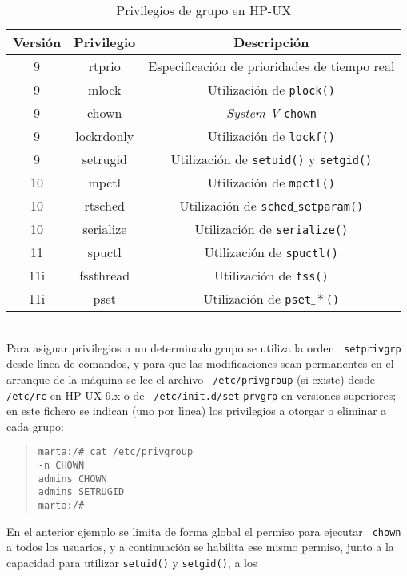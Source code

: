 \begin{table}
\begin{center}
\begin{tabular}{|c|c|c|}
\hline
Versi\'on & Privilegio & Descripci\'on\\
\hline
\hline
9 & {\sc rtprio} & Especificaci\'on de prioridades de tiempo real\\
\hline
9 & {\sc mlock} & Utilizaci\'on de {\tt plock()}\\
\hline
9 & {\sc chown} & {\it System V} {\tt chown}\\
\hline
9 & {\sc lockrdonly} & Utilizaci\'on de {\tt lockf()}\\
\hline
9 & {\sc setrugid} & Utilizaci\'on de {\tt setuid()} y {\tt setgid()}\\
\hline
10 & {\sc mpctl} & Utilizaci\'on de {\tt mpctl()}\\
\hline
10 & {\sc rtsched} & Utilizaci\'on de {\tt sched$\_$setparam()}\\
\hline
10 & {\sc serialize} & Utilizaci\'on de {\tt serialize()}\\
\hline
11 & {\sc spuctl} & Utilizaci\'on de {\tt spuctl()}\\
\hline
11i & {\sc fssthread} & Utilizaci\'on de {\tt fss()}\\
\hline
11i & {\sc pset} & Utilizaci\'on de {\tt pset$\_\ast$()}\\
\hline
\end{tabular}
\caption{Privilegios de grupo en HP-UX}
\label{privgrp}
\end{center}
\end{table}
\\Para asignar privilegios a un determinado grupo se utiliza la orden {\tt
setprivgrp} desde l\'{\i}nea de comandos, y para que las modificaciones sean
permanentes en el arranque de la m\'aquina se lee el archivo {\tt 
/etc/privgroup} (si existe) desde {\tt /etc/rc} en HP-UX 9.x o de {\tt
/etc/init.d/set$\_$prvgrp} en versiones superiores; en este fichero se indican 
(uno por l\'{\i}nea) los privilegios a otorgar o eliminar a cada grupo:
\begin{quote}
\begin{verbatim}
marta:/# cat /etc/privgroup
-n CHOWN
admins CHOWN
admins SETRUGID
marta:/# 
\end{verbatim}
\end{quote}
En el anterior ejemplo se limita de forma global el permiso para ejecutar {\tt
chown} a todos los usuarios, y a continuaci\'on se habilita ese mismo permiso, 
junto a la capacidad para utilizar {\tt setuid()} y {\tt setgid()}, a los 
